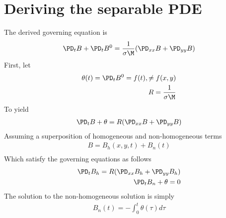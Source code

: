 \documentclass[11pt]{article}
\begin{document}
\MOONSTITLE
\maketitle
\section{Deriving the separable PDE}
The derived governing equation is
\begin{equation}\begin{aligned}
\PD_t B + \PD_t B^0 = \frac{1}{\sigma \M} (\PD_{xx} B + \PD_{yy} B) \\
\end{aligned} \end{equation}
First, let
\begin{equation}\begin{aligned}
\theta(t) = \PD_t B^0 = f(t), \ne f(x,y) \\
R = \frac{1}{\sigma \M} \\
\end{aligned} \end{equation}
To yield
\begin{equation}\begin{aligned}
\PD_t B + \theta = R (\PD_{xx} B + \PD_{yy} B) \\
\end{aligned} \end{equation}
Assuming a superposition of homogeneous and non-homogeneous terms
\begin{equation}\begin{aligned}
B = B_h(x,y,t) + B_n(t) \\
\end{aligned} \end{equation}
Which satisfy the governing equations as follows
\begin{equation}\begin{aligned}
\PD_t B_h = R (\PD_{xx} B_h + \PD_{yy} B_h) \\
\PD_t B_n + \theta = 0 \\
\end{aligned} \end{equation}
The solution to the non-homogeneous solution is simply
\begin{equation}\begin{aligned}
B_n(t) = - \int_0^t \theta(\tau) d\tau \\
\end{aligned} \end{equation}
\end{document}
